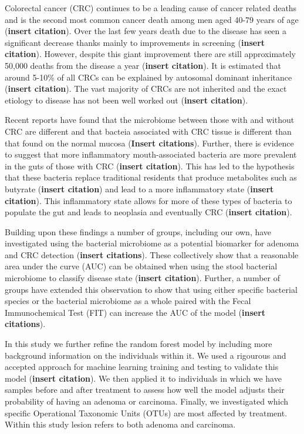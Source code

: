 \documentclass[12pt,]{article}
\begin{document}
Colorectal cancer (CRC) continues to be a leading cause of cancer
related deaths and is the second most common cancer death among men aged
40-79 years of age (\textbf{insert citation}). Over the last few years
death due to the disease has seen a significant decrease thanks mainly
to improvements in screening (\textbf{insert citation}). However,
despite this giant improvement there are still approximately 50,000
deaths from the disease a year (\textbf{insert citation}). It is
estimated that around 5-10\% of all CRCs can be explained by autosomal
dominant inheritance (\textbf{insert citation}). The vast majority of
CRCs are not inherited and the exact etiology to disease has not been
well worked out (\textbf{insert citation}).

Recent reports have found that the microbiome between those with and
without CRC are different and that bacteia associated with CRC tissue is
different than that found on the normal mucosa (\textbf{Insert
citations}). Further, there is evidence to suggest that more
inflammatory mouth-associated bacteria are more prevalent in the guts of
those with CRC (\textbf{insert citation}). This has led to the
hypothesis that these bacteria replace traditional residents that
produce metabolites such as butyrate (\textbf{insert citation}) and lead
to a more inflammatory state (\textbf{insert citation}). This
inflammatory state allows for more of these types of bacteria to
populate the gut and leads to neoplasia and eventually CRC
(\textbf{insert citation}).

Building upon these findings a number of groups, including our own, have
investigated using the bacterial microbiome as a potential biomarker for
adenoma and CRC detection (\textbf{insert citations}). These
collectively show that a reasonable area under the curve (AUC) can be
obtained when using the stool bacterial microbiome to classify disease
state (\textbf{insert citation}). Further, a number of groups have
extended this observation to show that using either specific bacterial
species or the bacterial microbiome as a whole paired with the Fecal
Immunochemical Test (FIT) can increase the AUC of the model
(\textbf{insert citations}).

In this study we further refine the random forest model by including
more background information on the individuals within it. We used a
rigourous and accepted approach for machine learning training and
testing to validate this model (\textbf{insert citation}). We then
applied it to individuals in which we have samples before and after
treatment to assess how well the model adjusts their probability of
having an adenoma or carcinoma. Finally, we investigated which specific
Operational Taxonomic Units (OTUs) are most affected by treatment.
Within this study lesion refers to both adenoma and carcinoma.
\end{document}
